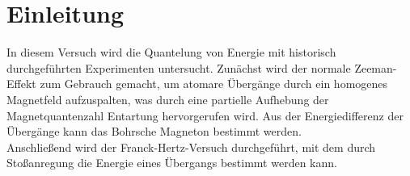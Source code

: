 \section{Einleitung}\label{sec:einleitung}

In diesem Versuch wird die Quantelung von Energie mit historisch durchgeführten Experimenten untersucht.
Zunächst wird der normale Zeeman-Effekt zum Gebrauch gemacht, um atomare Übergänge durch ein homogenes Magnetfeld
aufzuspalten, was durch eine partielle Aufhebung der Magnetquantenzahl Entartung hervorgerufen wird. Aus
der Energiedifferenz der Übergänge kann das Bohrsche Magneton bestimmt werden.\\
Anschließend wird der Franck-Hertz-Versuch durchgeführt, mit dem durch
Stoßanregung die Energie eines Übergangs bestimmt werden kann.
